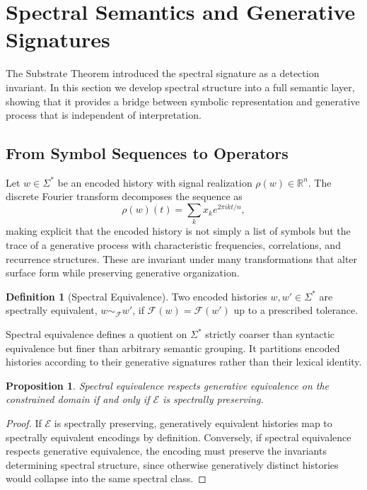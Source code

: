 \documentclass[12pt, a4paper]{article}
\theoremstyle{plain}
\newtheorem{proposition}[theorem]{Proposition}
\theoremstyle{definition}
\newtheorem{definition}[theorem]{Definition}
\theoremstyle{remark}
\begin{document}
\section{Spectral Semantics and Generative Signatures}

The Substrate Theorem introduced the spectral signature as a detection invariant. In this section we develop spectral structure into a full semantic layer, showing that it provides a bridge between symbolic representation and generative process that is independent of interpretation.

\subsection{From Symbol Sequences to Operators}

Let $w \in \Sigma^*$ be an encoded history with signal realization $\rho(w) \in \mathbb{R}^n$. The discrete Fourier transform decomposes the sequence as
\[
\rho(w)(t) = \sum_{k} \hat{x}_k e^{2\pi i k t / n},
\]
making explicit that the encoded history is not simply a list of symbols but the trace of a generative process with characteristic frequencies, correlations, and recurrence structures. These are invariant under many transformations that alter surface form while preserving generative organization.

\begin{definition}[Spectral Equivalence]
Two encoded histories $w, w' \in \Sigma^*$ are spectrally equivalent, $w \sim_{\mathcal{F}} w'$, if $\mathcal{F}(w) = \mathcal{F}(w')$ up to a prescribed tolerance.
\end{definition}

Spectral equivalence defines a quotient on $\Sigma^*$ strictly coarser than syntactic equivalence but finer than arbitrary semantic grouping. It partitions encoded histories according to their generative signatures rather than their lexical identity.

\begin{proposition}
Spectral equivalence respects generative equivalence on the constrained domain if and only if $\mathcal{E}$ is spectrally preserving.
\end{proposition}

\begin{proof}
If $\mathcal{E}$ is spectrally preserving, generatively equivalent histories map to spectrally equivalent encodings by definition. Conversely, if spectral equivalence respects generative equivalence, the encoding must preserve the invariants determining spectral structure, since otherwise generatively distinct histories would collapse into the same spectral class.
\end{proof}
\end{document}
